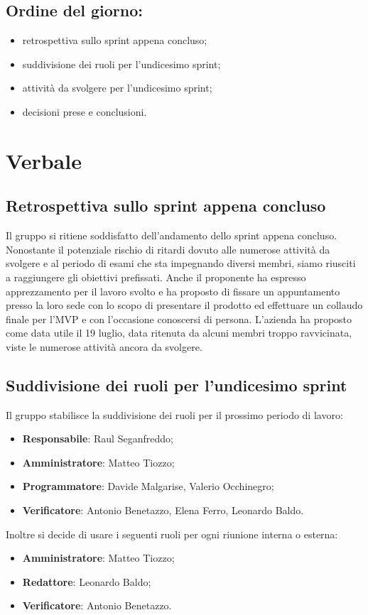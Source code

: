 \documentclass[italian,12pt]{article}
\begin{document}
\subsection*{Ordine del giorno:}
\begin{itemize}
	\item retrospettiva sullo sprint appena concluso;
	\item suddivisione dei ruoli per l'undicesimo sprint;
	\item attività da svolgere per l'undicesimo sprint;
	\item decisioni prese e conclusioni.
\end{itemize}


\newpage

\section{Verbale}

\subsection{Retrospettiva sullo sprint appena concluso}
Il gruppo si ritiene soddisfatto dell'andamento dello sprint appena concluso. Nonostante il potenziale rischio di ritardi dovuto alle numerose attività da svolgere e al periodo di esami che sta impegnando diversi membri, siamo riusciti a raggiungere gli obiettivi prefissati. Anche il proponente ha espresso apprezzamento per il lavoro svolto e ha proposto di fissare un appuntamento presso la loro sede con lo scopo di presentare il prodotto ed effettuare un collaudo finale per l'MVP e con l'occasione conoscersi di persona. L'azienda ha proposto come data utile il 19 luglio, data ritenuta da alcuni membri troppo ravvicinata, viste le numerose attività ancora da svolgere.

\subsection{Suddivisione dei ruoli per l'undicesimo sprint}
Il gruppo stabilisce la suddivisione dei ruoli per il prossimo periodo di lavoro:
\begin{itemize}
	\item \textbf{Responsabile}: Raul Seganfreddo;
	\item \textbf{Amministratore}: Matteo Tiozzo;
	\item \textbf{Programmatore}: Davide Malgarise, Valerio Occhinegro;
	\item \textbf{Verificatore}: Antonio Benetazzo, Elena Ferro, Leonardo Baldo.
\end{itemize}
\newblock
Inoltre si decide di usare i seguenti ruoli per ogni riunione interna o esterna:
\begin{itemize}
	\item \textbf{Amministratore}: Matteo Tiozzo;
	\item \textbf{Redattore}: Leonardo Baldo;
	\item \textbf{Verificatore}: Antonio Benetazzo.
\end{itemize}
\end{document}
